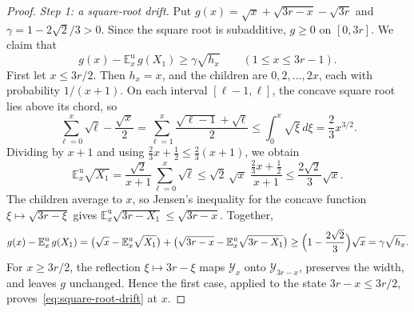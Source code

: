 \begin{proof}
\emph{Step 1: a square-root drift.} Put
\(g(x)=\sqrt x+\sqrt{3r-x}-\sqrt{3r}\) and \(\gamma=1-2\sqrt2/3>0\).
Since the square root is subadditive, \(g\ge0\) on \([0,3r]\). We claim
that
\begin{equation}\label{eq:square-root-drift}
 g(x)-\mathbb E^{\mathrm u}_x\,g(X_1)\ge\gamma\sqrt{h_x}
 \qquad(1\le x\le3r-1).
\end{equation}
First let \(x\le3r/2\). Then \(h_x=x\), and the children are
\(0,2,\ldots,2x\), each with probability \(1/(x+1)\). On each interval
\([\ell-1,\ell]\), the concave square root lies above its chord, so
\[
 \sum_{\ell=0}^x\sqrt\ell-\frac{\sqrt x}2
 =\sum_{\ell=1}^x\frac{\sqrt{\ell-1}+\sqrt\ell}2
 \le\int_0^x\sqrt\xi\,d\xi=\frac23x^{3/2}.
\]
Dividing by \(x+1\) and using \(\frac23x+\frac12\le\frac23(x+1)\), we
obtain
\[
 \mathbb E^{\mathrm u}_x\sqrt{X_1}
 =\frac{\sqrt2}{x+1}\sum_{\ell=0}^x\sqrt\ell
 \le\sqrt2\,\sqrt x\;\frac{\frac23x+\frac12}{x+1}
 \le\frac{2\sqrt2}3\sqrt x.
\]
The children average to \(x\), so Jensen's inequality for the concave
function \(\xi\mapsto\sqrt{3r-\xi}\) gives
\(\mathbb E^{\mathrm u}_x\sqrt{3r-X_1}\le\sqrt{3r-x}\). Together,
\[
 g(x)-\mathbb E^{\mathrm u}_x\,g(X_1)
 =\bigl(\sqrt x-\mathbb E^{\mathrm u}_x\sqrt{X_1}\bigr)
  +\bigl(\sqrt{3r-x}-\mathbb E^{\mathrm u}_x\sqrt{3r-X_1}\bigr)
 \ge\Bigl(1-\frac{2\sqrt2}3\Bigr)\sqrt x=\gamma\sqrt{h_x}.
\]
For \(x\ge3r/2\), the reflection \(\xi\mapsto3r-\xi\) maps
\(\mathcal Y_x\) onto \(\mathcal Y_{3r-x}\), preserves the width, and
leaves \(g\) unchanged. Hence the first case, applied to the state
\(3r-x\le3r/2\), proves~\eqref{eq:square-root-drift} at \(x\).


\end{proof}
